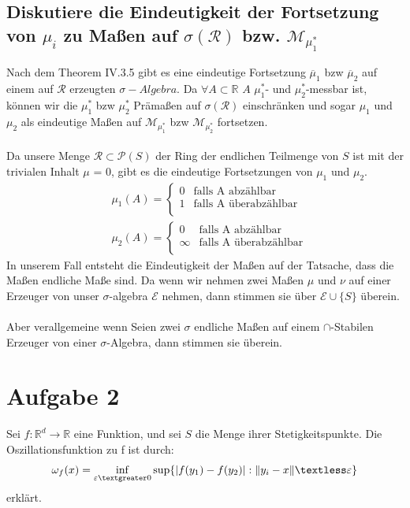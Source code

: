 \documentclass[12pt,a4paper]{article}
\begin{document}
\subsection{Diskutiere die Eindeutigkeit der Fortsetzung von $\mu_i$ zu Maßen auf $\sigma(\mathscr{R})$ bzw. 
$\mathscr{M}_{\mu_1^{*}}$} 
Nach dem Theorem IV.3.5 gibt es eine  eindeutige Fortsetzung $\overline{\mu}_1$ bzw $\overline{\mu}_2$ auf einem auf $\mathscr{R} $ erzeugten $\sigma-Algebra$. Da $\forall A \subset \mathbb{R}$  $A$ $\mu_1^{*} $- und $\mu_2^{*} $-messbar ist, können wir die $\mu_1^{*}$ bzw $\mu_2^{*}$ Prämaßen auf $\sigma(\mathscr{R})$ einschränken und sogar $\mu_1 $ und $\mu_2 $ als eindeutige Maßen auf $\mathscr{M}_{\mu_1^{*}}$ bzw $\mathscr{M}_{\mu_2^{*}}$ fortsetzen.\\\\
Da unsere Menge $\mathscr{R} \subset \mathscr{P}(S)$ der Ring der endlichen Teilmenge von $S$ ist mit der trivialen Inhalt $\mu$ = 0, gibt es die eindeutige Fortsetzungen von $\mu_1$ und $\mu_2$.
\begin{align*}
&\mu_1(A) =  \left\{
	\begin{array}{ll}
     	0 & \text{falls A abzählbar} \\
      	1 & \text{falls A überabzählbar} \\
	\end{array} 
	\right. \\
&\mu_2(A) =   \left\{
	\begin{array}{ll}
      	0 & \text{falls A abzählbar} \\
      	\infty & \text{falls A überabzählbar} \\
	\end{array} 
	\right. 	
\end{align*}
In unserem Fall entsteht die Eindeutigkeit der Maßen auf der Tatsache, dass die Maßen endliche Maße sind. Da wenn wir nehmen zwei Maßen $\mu$ und $\nu$ auf einer Erzeuger von unser $\sigma$-algebra $\mathscr{E}$ nehmen, dann stimmen sie über $\mathscr{E} \cup \{S \}$ überein. \\\\Aber verallgemeine wenn Seien zwei $\sigma$ endliche Maßen auf einem $\cap$-Stabilen Erzeuger von einer $\sigma$-Algebra, dann stimmen sie überein.


\section{Aufgabe 2}
Sei $f: \mathbb{R}^d \rightarrow \mathbb{R}$ eine Funktion, und sei $S$ die Menge ihrer Stetigkeitspunkte. Die Oszillationsfunktion zu f ist durch:
\begin{align*}
	\omega_f(x) = \inf_{\varepsilon \textgreater 0}\sup\{|f(y_1) - f(y_2)|: \lVert y_i -x \lVert\textless \varepsilon\}
\end{align*}
erklärt.
\end{document}
